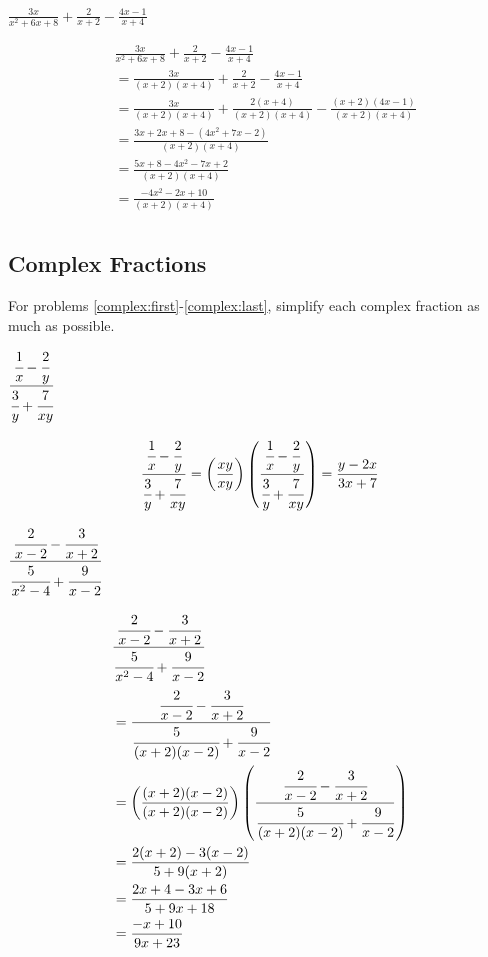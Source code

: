 \documentclass[fleqn,addpoints]{exam}
\begin{document}
\begin{questions}
\question[10] \( \displaystyle \frac{3x}{x^2+6x+8} + \frac{2}{x+2} - \frac{4x-1}{x+4} \)
\label{add:last}
\begin{solution}[5 cm]
\begin{align*}
  & \frac{3x}{x^2+6x+8} + \frac{2}{x+2} - \frac{4x-1}{x+4} \\
  &= \frac{3x}{(x+2)(x+4)} + \frac{2}{x+2} - \frac{4x-1}{x+4} \\
  &= \frac{3x}{(x+2)(x+4)} + \frac{2(x+4)}{(x+2)(x+4)} - \frac{(x+2)(4x-1)}{(x+2)(x+4)} \\
  &= \frac{3x+2x+8-(4x^2+7x-2)}{(x+2)(x+4)} \\
  &= \frac{5x+8-4x^2-7x+2}{(x+2)(x+4)} \\
  &= \frac{-4x^2 -2x + 10}{(x+2)(x+4)} \\
\end{align*}

\end{solution}

\subsection{Complex Fractions}

For problems \ref{complex:first}-\ref{complex:last}, simplify each complex fraction as much as possible.

\question[5] \( \displaystyle \frac{\cfrac{1}{x} - \cfrac{2}{y}} {\cfrac{3}{y} + \cfrac{7}{xy}} \)
\label{complex:first}
\begin{solution}[4 cm]
\[
  \frac{\cfrac{1}{x} - \cfrac{2}{y}} {\cfrac{3}{y} + \cfrac{7}{xy}} 
  = \left( \frac{xy}{xy} \right) \left( \frac{\cfrac{1}{x} - \cfrac{2}{y}} {\cfrac{3}{y} + \cfrac{7}{xy}} \right)
  = \frac{y-2x}{3x+7}
\]
\end{solution}

\question[7] \( \displaystyle \frac{\cfrac{2}{x-2} - \cfrac{3}{x+2}} { \cfrac{5}{x^2-4} + \cfrac{9}{x-2} }\)
\begin{solution}[5 cm]
\begin{align*}
  & \frac{\cfrac{2}{x-2} - \cfrac{3}{x+2}} { \cfrac{5}{x^2-4} + \cfrac{9}{x-2} } \\
  &= \frac{\cfrac{2}{x-2} - \cfrac{3}{x+2}} { \cfrac{5}{(x+2)(x-2)} + \cfrac{9}{x-2} } \\
  &= \left( \frac{(x+2)(x-2)}{(x+2)(x-2)} \right) \left( \frac{\cfrac{2}{x-2} - \cfrac{3}{x+2}} { \cfrac{5}{(x+2)(x-2)} + \cfrac{9}{x-2} } \right) \\
  &= \frac{2(x+2) - 3(x-2)}{5 + 9(x+2)} \\
  &= \frac{2x+4 - 3x + 6}{5 + 9x+ 18} \\
  &= \frac{-x+10}{9x+ 23} \\
\end{align*}


\end{solution}
\end{questions}
\end{document}
